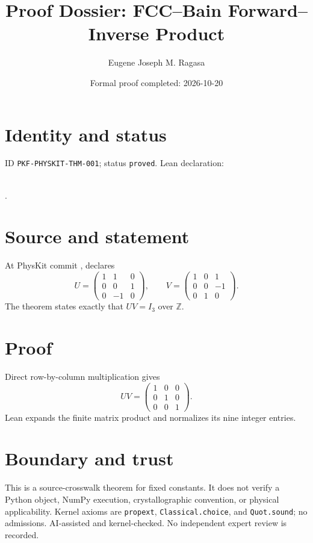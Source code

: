 \documentclass[11pt]{article}
\title{Proof Dossier: FCC--Bain Forward--Inverse Product}\author{Eugene Joseph M. Ragasa}\date{Formal proof completed: 2026-10-20}
\begin{document}
\maketitle
\section{Identity and status}
ID \texttt{PKF-PHYSKIT-THM-001}; status \texttt{proved}. Lean declaration:
\par{}\\
{\tiny{}}.
\section{Source and statement}
At PhysKit commit ,
 declares
\[
U=\begin{pmatrix}1&1&0\\0&0&1\\0&-1&0\end{pmatrix},\qquad
V=\begin{pmatrix}1&0&1\\0&0&-1\\0&1&0\end{pmatrix}.
\]
The theorem states exactly that $UV=I_3$ over $\mathbb Z$.
\section{Proof}
Direct row-by-column multiplication gives
\[
UV=\begin{pmatrix}1&0&0\\0&1&0\\0&0&1\end{pmatrix}.
\]
Lean expands the finite matrix product and normalizes its nine integer entries.
\section{Boundary and trust}
This is a source-crosswalk theorem for fixed constants. It does not verify a Python object,
NumPy execution, crystallographic convention, or physical applicability. Kernel axioms are
\texttt{propext}, \texttt{Classical.choice}, and \texttt{Quot.sound}; no admissions.
AI-assisted and kernel-checked. No independent expert review is recorded.
\end{document}
